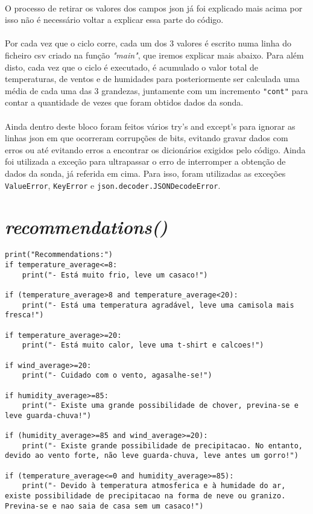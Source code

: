 \documentclass[a4paper]{report}
\begin{document}
\paragraph{}O processo de retirar os valores dos campos \ac{json} já foi explicado mais acima por isso não é necessário voltar a explicar essa parte do código.

\paragraph{}Por cada vez que o ciclo corre, cada um dos 3 valores é escrito numa linha do ficheiro \ac{csv} criado na função \textit{"main"}, que iremos explicar mais abaixo.\cite{csv} Para além disto, cada vez que o ciclo é executado, é acumulado o valor total de temperaturas, de ventos e de humidades para posteriormente ser calculada uma média de cada uma das 3 grandezas, juntamente com um incremento \texttt{"cont"} para contar a quantidade de vezes que foram obtidos dados da sonda.

\paragraph{}Ainda dentro deste bloco foram feitos vários try's and except's para ignorar as linhas \ac{json} em que ocorreram corrupções de bits, evitando gravar dados com erros ou até evitando erros a encontrar os dicionários exigidos pelo código. Ainda foi utilizada a exceção para ultrapassar o erro de interromper a obtenção de dados da sonda, já referida em cima. Para isso, foram utilizadas as exceções \texttt{ValueError}, \texttt{KeyError} e \texttt{json.decoder.JSONDecodeError}.

\newpage

\section{\textit{recommendations()}}
\begin{lstlisting}
print("Recommendations:") 
if temperature_average<=8:
    print("- Está muito frio, leve um casaco!")

if (temperature_average>8 and temperature_average<20):
    print("- Está uma temperatura agradável, leve uma camisola mais fresca!")
    
if temperature_average>=20:
    print("- Está muito calor, leve uma t-shirt e calcoes!")
    
if wind_average>=20:
    print("- Cuidado com o vento, agasalhe-se!")

if humidity_average>=85:
    print("- Existe uma grande possibilidade de chover, previna-se e leve guarda-chuva!")

if (humidity_average>=85 and wind_average>=20):
    print("- Existe grande possibilidade de precipitacao. No entanto, devido ao vento forte, não leve guarda-chuva, leve antes um gorro!")
    
if (temperature_average<=0 and humidity_average>=85):
    print("- Devido à temperatura atmosferica e à humidade do ar, existe possibilidade de precipitacao na forma de neve ou granizo. Previna-se e nao saia de casa sem um casaco!")
\end{lstlisting}
\end{document}
